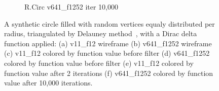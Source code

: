 \begin{figure}[ht]
{\begin{subfigure}[b]{0.48\linewidth}
		\caption{R.Circ v641\_f1252 iter 10,000}\label{fig:rcirc.f}
	\end{subfigure}}
	{\caption[Synthetic random vertices equally distributed per radius, Dirac delta function]{A synthetic circle filled with random vertices equaly distributed per radius, triangulated by Delauney method~\cite[p.~??]{todoCitation}, with a Dirac delta function applied: (a) v11\_f12 wireframe (b) v641\_f1252 wireframe (c) v11\_f12 colored by function value before filter (d) v641\_f1252 colored by function value before filter (e) v11\_f12 colored by function value after 2 iterations (f) v641\_f1252 colored by function value after 10,000 iterations.
}\label{fig:rcirc}}
\end{figure}
\todoCitation{}

